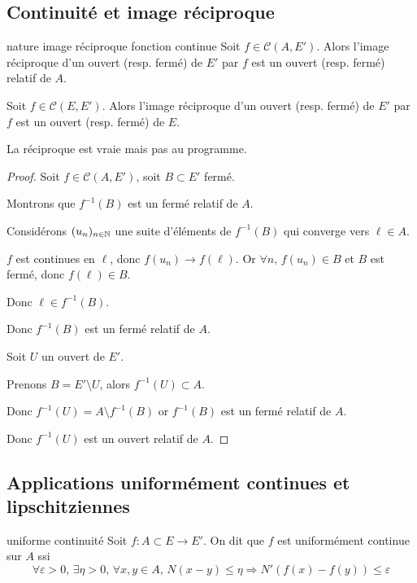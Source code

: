 \subsection{Continuité et image réciproque }

\begin{theoreme}{nature image réciproque fonction continue }{}
    Soit $f \in \mathscr C(A, E')$. Alors l'image réciproque d'un ouvert (resp. fermé) 
    de $E'$ par $f$ est un ouvert (resp. fermé) relatif de $A$.

    Soit $f \in \mathscr C(E, E')$. Alors l'image réciproque d'un ouvert (resp. fermé)
    de $E'$ par $f$ est un ouvert (resp. fermé) de $E$.
\end{theoreme}

\begin{remarque}
    La réciproque est vraie mais pas au programme.
\end{remarque}

\begin{proof}
    Soit $f \in \mathscr C(A, E')$, soit $B \subset E'$ fermé. 

    Montrons que $f^{-1}(B)$ est un fermé relatif de $A$.

    Considérons $(u_n) _{n \in \mathbb{N}}$ une suite d'éléments de $f^{-1}(B)$ qui converge vers $\ell \in A$.

    $f$ est continues en $\ell$, donc $f(u_n) \rightarrow f(\ell)$. 
    Or $\forall n, \, f(u_n) \in B$ et $B$ est fermé, donc $f(\ell) \in B$.

    Donc $\ell \in f^{-1}(B)$. 

    Donc $f^{-1}(B)$ est un fermé relatif de $A$.


    \svspace Soit $U$ un ouvert de $E'$.

    Prenons $B = E' \setminus U$, alors $f^{-1}(U) \subset A$. 

    Donc $f^{-1}(U) = A \setminus f^{-1}(B)$ or $f^{-1}(B)$ est un fermé relatif de $A$.

    Donc $f^{-1}(U)$ est un ouvert relatif de $A$.
\end{proof}

\subsection{Applications uniformément continues et lipschitziennes}

\begin{definition}{uniforme continuité}{}
    Soit $f : A \subset E \to E'$. On dit que $f$ est uniformément continue sur $A$ ssi 
    $$\forall \varepsilon > 0, \, \exists \eta > 0, \, \forall x, y \in A, \, N(x - y) \leqslant \eta \Rightarrow N'(f(x) - f(y)) \leqslant \varepsilon$$
\end{definition}

